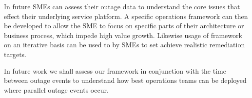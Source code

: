 \documentclass[conference]{IEEEtran}
\begin{document}
In future SMEs can assess their outage data to understand the core issues that effect their underlying service platform. A specific operations framework can then be developed to allow the SME to focus on specific parts of their architecture or business process, which impede high value growth. Likewise usage of framework on an iterative basis can be used to by SMEs to set achieve realistic remediation targets. \par

In future work we shall assess our framework in conjunction with the time between outage events to understand how best operations teams can be deployed where parallel outage events occur.  \par
%
%



%
%
\end{document}
